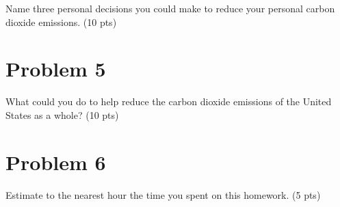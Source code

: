 \documentclass{article}
\newif\ifsolution
\newcommand{\solution}[1]
{\ifsolution
\vspace{10pt}
{\color{answer-color} #1}
\else\fi}
\begin{document}
Name three personal decisions you could make to reduce your personal
carbon dioxide emissions. (10 pts)


\solution{
There are many possible answers to this question.  Your options include
using more efficient technologies for transportation or energy, changing
your purchasing patterns to buy products with lower carbon footprints,
and making lifestyle changes that lower your use of carbon such as diet
or your mode of transportation.
}

\section*{Problem 5}

What could you do to help reduce the carbon dioxide emissions of the United
States as a whole? (10 pts)

\solution{
In order to affect the carbon emissions outside of your direct control,
you have to exert either political or economic pressure.  You can
communicate with lawmakers to announce your support for the policies and
educate others about laws or policies.  Economically, if there is a
company with practices you support, you can use that companies services
or products.
}

\section*{Problem 6}

Estimate to the nearest hour the time you spent on this homework. (5
pts)
\end{document}
